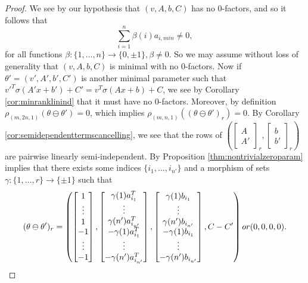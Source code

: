 \documentclass[10pt,a4paper]{amsart}
\begin{document}
\begin{proof}
    We see by our hypothesis that $(v, A, b, C)$ has no 0-factors, and so it follows that
    $$
    \sum_{i=1}^n \beta(i) a_{i, min} \neq 0,
    $$
    for all functions $\beta: \{1, \ldots, n\}\rightarrow \{0,  \pm 1\}, \beta\neq 0$. So we may assume without loss of generality that $(v, A, b, C)$ is minimal with no 0-factors. Now if $\theta'=(v',A', b', C')$ is another minimal parameter such that $v'^T\sigma (A'x+b')+C'=v^T\sigma (Ax+b)+C$, we see by Corollary \ref{cor:minranklinind} that it must have no 0-factors. Moreover, by definition $\rho_{(m,2n,1)}(\theta\ominus\theta')=0$, which implies $\rho_{(m,n,1)}((\theta\ominus\theta')_r)=0$. By Corollary \ref{cor:semidependenttermscancelling}, we see that the rows of $\left(\begin{bmatrix}
        A \\ A'
    \end{bmatrix}_r, \begin{bmatrix}
        b \\ b'
    \end{bmatrix}_r\right)$ are pairwise linearly semi-independent. By Proposition \ref{thm:nontrivialzeroparam} implies that there exists some indices $\{i_1, \ldots, i_{n'}\}$ and a morphism of sets $\gamma : \{1, \ldots, r\}\rightarrow \{\pm 1\}$ such that 
    $$
    (\theta\ominus \theta')_r = \left(\begin{bmatrix}
        1 \\ \vdots \\ 1 \\ -1 \\ \vdots \\ -1
    \end{bmatrix}, \begin{bmatrix}
        \gamma(1)a_{i_1}^T \\ \vdots \\ \gamma(n')a_{i_{n'}}^T \\ -\gamma(1)a_{i_1}^T \\ \vdots \\ -\gamma(n')a_{i_{n'}}^T
    \end{bmatrix}, \begin{bmatrix}
        \gamma(1)b_{i_1} \\ \vdots \\ \gamma(n')b_{i_{n'}} \\ -\gamma(1)b_{i_1} \\ \vdots \\ -\gamma(n')b_{i_{n'}}
    \end{bmatrix}, C-C'\right) \textup{ or } (0,0,0,0).
$$
\end{proof}
\end{document}
